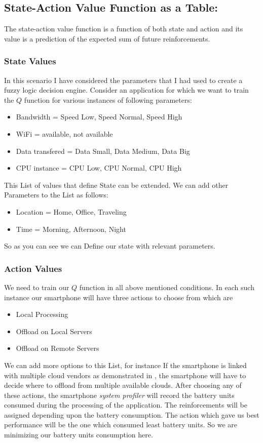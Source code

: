 \documentclass[12pt]{report}
\begin{document}
\subsection{State-Action Value Function as a Table:}
The state-action value function is a function of both state and action and its value is a prediction of the expected sum of future reinforcements.
\subsubsection{State Values}
In this scenario I have considered the parameters that I had used to create a fuzzy logic decision engine. Consider an application for which we want to train the $Q$ function for various instances of following parameters:
\begin{itemize}
   \item Bandwidth = Speed Low, Speed Normal, Speed High
   \item WiFi = available, not available
   \item Data transfered = Data Small, Data Medium, Data Big
   \item CPU instance = CPU Low, CPU Normal, CPU High
\end{itemize}
This List of values that define State can be extended. We can add other Parameters to the List as follows:
\begin{itemize}
	\item Location = Home, Office, Traveling
	\item Time = Morning, Afternoon, Night
\end{itemize}
So as you can see we can Define our state with relevant parameters.
\subsubsection{Action Values}
We need to train our $Q$ function in all above mentioned conditions. In each such instance our smartphone will have three actions to choose from which are
\begin{itemize}
   \item Local Processing
   \item Offload on Local Servers
   \item Offload on Remote Servers
\end{itemize}
We can add more options to this List, for instance If the smartphone is linked with multiple cloud vendors as demonstrated in \cite{flores2011generic}, the smartphone will have to decide where to offload from multiple available clouds.
After choosing any of these actions, the smartphone \textit{system profiler} will record the battery units consumed during the processing of the application. The reinforcements will be assigned depending upon the battery consumption. The action which gave us best performance will be the one which consumed least battery units. So we are minimizing our battery units consumption here.
\end{document}
